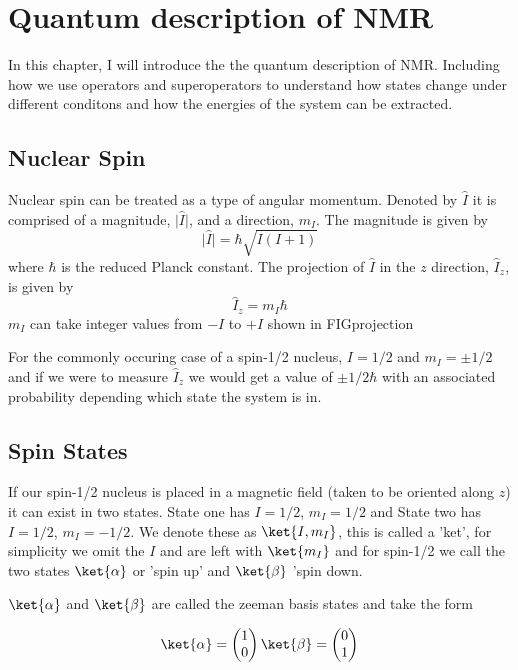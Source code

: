
\chapter{Quantum description of NMR}

In this chapter, I will introduce the the quantum description of NMR. Including how
we use operators and superoperators to understand how states change under different conditons and how the energies of the system can be extracted.

\section{Nuclear Spin}

Nuclear spin can be treated as a type of angular momentum. Denoted by $\hat{I}$
it is comprised of a magnitude, $\lvert\hat{I}\rvert$, and a direction, $m_I$.
The magnitude is given by
\begin{equation}
  \lvert\hat{I}\rvert = \hbar\sqrt{I(I+1)}
\end{equation}
where $\hbar$ is the reduced Planck constant. The projection of $\hat{I}$ in
the $z$ direction, $\hat{I}_{z}$, is given by
\begin{equation}
  \hat{I}_{z} = m_I\hbar
\end{equation}
$m_{I}$ can take integer values from $-I$ to $+I$ shown in FIGprojection

For the commonly occuring case of a spin-1/2 nucleus, $I=1/2$ and $m_I = ±1/2$ and if we were to measure $\hat{I}_z$ we would get a value of $±1/2\hbar$ with an associated probability depending which state the system is in.

\section{Spin States}

If our spin-1/2 nucleus is placed in a magnetic field (taken to be oriented along $z$) it can exist in two states.
State one has $I = 1/2$, $m_I = 1/2$ and State two has $I = 1/2$, $m_I = -1/2$. We denote these as $\ket{I,m_I}$, this is called a 'ket', for simplicity we omit the $I$ and are left with
$\ket{m_I}$ and for spin-1/2 we call the two states $\ket{\alpha}$ or 'spin up' and $\ket{\beta}$ 'spin down.

$\ket{\alpha}$ and $\ket{\beta}$ are called the zeeman basis states and take the form

\begin{equation}
  \ket{\alpha} = \begin{pmatrix}
    1\\
    0
\end{pmatrix}
 \ket{\beta} = \begin{pmatrix}
   0\\
   1
\end{pmatrix}
\end{equation}

